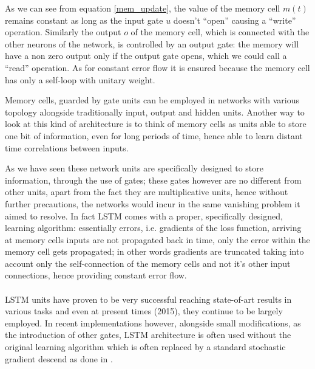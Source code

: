 As we can see from equation \ref{mem_update}, the value of the memory cell $m(t)$ remains constant as long as the input 
gate $u$ doesn't ``open'' causing a ``write'' operation. Similarly the output $o$ of the memory cell, which is 
connected with 
the other neurons of the network, is controlled by an output gate: the memory will have a non zero output only if the 
output gate opens, which we could call a ``read'' operation. As for constant error flow it is ensured because the 
memory cell has only a self-loop with unitary weight.

Memory cells, guarded by gate units can be employed in networks with various topology alongside traditionally 
input, output and hidden units. Another way to look at this kind of architecture is to think of memory cells as units 
able to store one bit of information, even for long periods of time, hence able to learn distant time correlations 
between inputs.

As we have seen these network units are specifically designed to store information, through the use of gates; these 
gates however are no different from other units, apart from the fact they are multiplicative units, hence without 
further precautions, the networks would incur in the same vanishing problem it aimed to resolve. In fact LSTM comes with 
a proper, specifically designed, learning algorithm: essentially errors, i.e. gradients of the loss function, arriving at memory cells inputs are not propagated back in time, only 
the error within the memory cell gets propagated; in other words gradients are truncated taking into account only the 
self-connection of the memory cells and not it's other input connections, hence providing constant error flow.
\\\\
LSTM units have proven to be very successful reaching state-of-art results in various tasks and even at present times 
(2015), they continue to be largely
employed. In recent implementations however, alongside small modifications, as the introduction of other gates, LSTM 
architecture is often used without the original learning algorithm which is often replaced by a standard stochastic 
gradient descend as done in \cite{lstmGraves}.







